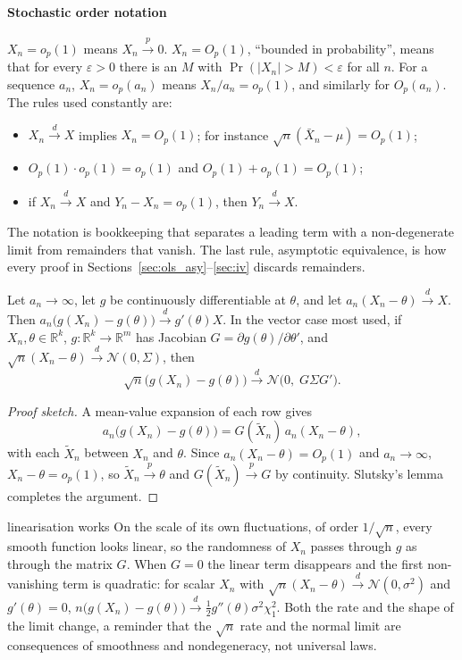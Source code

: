 \documentclass[11pt,a4paper]{article}
\newcommand{\R}{\mathbb{R}}
\newcommand{\N}{\mathcal{N}}
\newcommand{\cp}{\xrightarrow{\;p\;}}
\newcommand{\cd}{\xrightarrow{\;d\;}}
\newcommand{\op}{o_p}
\newcommand{\Op}{O_p}
\begin{document}
\paragraph{Stochastic order notation}
$X_n=\op(1)$ means $X_n\cp0$. $X_n=\Op(1)$, ``bounded in probability'', means that for every $\varepsilon>0$ there is an $M$ with $\Pr(|X_n|>M)<\varepsilon$ for all $n$. For a sequence $a_n$, $X_n=\op(a_n)$ means $X_n/a_n=\op(1)$, and similarly for $\Op(a_n)$. The rules used constantly are:
\begin{itemize}
\item $X_n\cd X$ implies $X_n=\Op(1)$; for instance $\sqrt n(\bar X_n-\mu)=\Op(1)$;
\item $\Op(1)\cdot\op(1)=\op(1)$ and $\Op(1)+\op(1)=\Op(1)$;
\item if $X_n\cd X$ and $Y_n-X_n=\op(1)$, then $Y_n\cd X$.
\end{itemize}
The notation is bookkeeping that separates a leading term with a non-degenerate limit from remainders that vanish. The last rule, asymptotic equivalence, is how every proof in Sections~\ref{sec:ols_asy}--\ref{sec:iv} discards remainders.

\begin{proposition}
Let $a_n\to\infty$, let $g$ be continuously differentiable at $\theta$, and let $a_n(X_n-\theta)\cd X$. Then $a_n\big(g(X_n)-g(\theta)\big)\cd g'(\theta)X$. In the vector case most used, if $X_n,\theta\in\R^k$, $g\colon\R^k\to\R^m$ has Jacobian $G=\partial g(\theta)/\partial\theta'$, and $\sqrt n(X_n-\theta)\cd\N(0,\Sigma)$, then
\[
\sqrt n\big(g(X_n)-g(\theta)\big)\cd\N\big(0,\;G\Sigma G'\big).
\]
\end{proposition}

\begin{proof}[Proof sketch]
A mean-value expansion of each row gives
\[
a_n\big(g(X_n)-g(\theta)\big)=G(\tilde X_n)\,a_n(X_n-\theta),
\]
with each $\tilde X_n$ between $X_n$ and $\theta$. Since $a_n(X_n-\theta)=\Op(1)$ and $a_n\to\infty$, $X_n-\theta=\op(1)$, so $\tilde X_n\cp\theta$ and $G(\tilde X_n)\cp G$ by continuity. Slutsky's lemma completes the argument.
\end{proof}

\begin{whybox}{linearisation works}
On the scale of its own fluctuations, of order $1/\sqrt n$, every smooth function looks linear, so the randomness of $X_n$ passes through $g$ as through the matrix $G$. When $G=0$ the linear term disappears and the first non-vanishing term is quadratic: for scalar $X_n$ with $\sqrt n(X_n-\theta)\cd\N(0,\sigma^2)$ and $g'(\theta)=0$, $n\big(g(X_n)-g(\theta)\big)\cd\tfrac12g''(\theta)\sigma^2\chi^2_1$. Both the rate and the shape of the limit change, a reminder that the $\sqrt n$ rate and the normal limit are consequences of smoothness and nondegeneracy, not universal laws.
\end{whybox}
\end{document}
